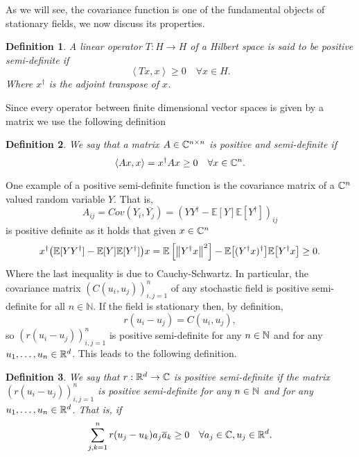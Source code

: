 \documentclass[12pt]{article}
\newtheorem{definition}{Definition}
\newcommand{\br}[1]{\left\langle#1\right\rangle}
\begin{document}
As we will see, the covariance function is one of the fundamental objects of stationary fields, we now discuss its properties.
\begin{definition}
	A linear operator $T: H\to H$ of a Hilbert space is said to be positive semi-definite if
	\begin{equation*}
		\br{Tx,x}\geq 0 \quad\forall x \in H.
	\end{equation*}
	Where $x^\dagger$ is the adjoint transpose of $x$.
\end{definition}
Since every operator between finite dimensional vector spaces is given by a matrix we use the following definition
\begin{definition}
	We say that a matrix $A \in \mathbb{C}^{n\times n}$ is positive and semi-definite if
	\begin{equation*}
		\br{Ax,x}=x^\dagger Ax\geq 0\quad\forall x \in \C^n.
	\end{equation*}
\end{definition}
One example of a positive semi-definite function is the covariance matrix of a $\mathbb{C}^n$ valued random variable  $Y$. That is, $$A_{ij}=Cov(Y_i,\overline{Y_j})=(YY^\dagger-\mathbb{E}[Y]\mathbb{E}[Y^\dagger])_{ij}$$ is positive definite as it holds that given $x\in \mathbb{C}^n$
\begin{equation*}
	x^\dagger\qty(\mathbb{E}[YY^\dagger]-\mathbb{E}[Y]\mathbb{E}[Y^\dagger])x=\mathbb{E}\left[\norm{Y^\dagger x}^2\right]-\mathbb{E}\qty[(Y^\dagger x)^\dagger]\mathbb{E}\qty[Y^\dagger x]\geq 0.
\end{equation*}
Where the last inequality is due to Cauchy-Schwartz.
In particular, the covariance matrix $(C(u_i,u_j))_{i,j=1}^n$ of any stochastic field is positive semi-definite for all $n\in\mathbb{N}$. If the field is stationary then, by definition,
$$r(u_i-u_j)=C(u_i,u_j),$$
so $(r(u_i-u_j))_{i,j=1}^n$ is positive semi-definite for any  $n\in\mathbb{N}$ and for any $u_1,\ldots,u_n \in {\mathbb R}^d$.
This leads to the following definition.
\begin{definition}
	We say that $r:{\mathbb R}^d\to \mathbb{C}$ is positive semi-definite if the matrix  $(r(u_i-u_j))_{i,j=1}^n$ is positive semi-definite for any  $n\in\mathbb{N}$ and for any $u_1,\ldots,u_n \in {\mathbb R}^d$. That is, if
	\begin{equation*}
		\sum_{j,k=1}^{n} r(u_j-u_k)a_j\overline{a}_k\geq 0 \quad\forall a_j \in \mathbb{C}, u_j\in {\mathbb R}^d.
	\end{equation*}
\end{definition}
\end{document}
